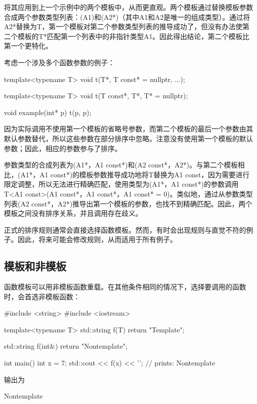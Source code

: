 将其应用到上一个示例中的两个模板中，从而更直观。两个模板通过替换模板参数合成两个参数类型列表：(A1)和(A2*)（其中A1和A2是唯一的组成类型）。通过将A2*替换为T，第一个模板对第二个参数类型列表的推导成功了，但没有办法使第二个模板的T*匹配第一个列表中的非指针类型A1。因此得出结论，第二个模板比第一个更特化。

考虑一个涉及多个函数参数的例子：

\begin{cpp}
template<typename T>
void t(T*, T const* = nullptr, ...);

template<typename T>
void t(T const*, T*, T* = nullptr);

void example(int* p)
{
	t(p, p);
}
\end{cpp}

因为实际调用不使用第一个模板的省略号参数，而第二个模板的最后一个参数由其默认参数替代，所以这些参数在部分排序中忽略。注意没有使用第一个模板的默认参数；因此，相应的参数参与了排序。

参数类型的合成列表为(A1*，A1 const*)和(A2 const*，A2*)。与第二个模板相比，(A1*，A1 const*)的模板参数推导成功地将T替换为A1 const，因为需要进行限定调整，所以无法进行精确匹配，使用类型为(A1*，A1 const*)的参数调用T<A1 const>(A1 const*，A1 const*，A1 const* = 0)。类似地，通过从参数类型列表(A2 const*，A2*)推导出第一个模板的参数，也找不到精确匹配。因此，两个模板之间没有排序关系，并且调用存在歧义。

正式的排序规则通常会直接选择函数模板。然而，有时会出现规则与直觉不符的例子。因此，将来可能会修改规则，从而适用于所有例子。

\subsection{模板和非模板}

函数模板可以用非模板函数重载。在其他条件相同的情况下，选择要调用的函数时，会首选非模板函数：

\begin{cpp}
#include <string>
#include <iostream>

template<typename T>
std::string f(T)
{
	return "Template";
}

std::string f(int&)
{
	return "Nontemplate";
}

int main()
{
	int x = 7;
	std::cout << f(x) << '\n'; // prints: Nontemplate
}
\end{cpp}

输出为

\begin{shell}
Nontemplate
\end{shell}

